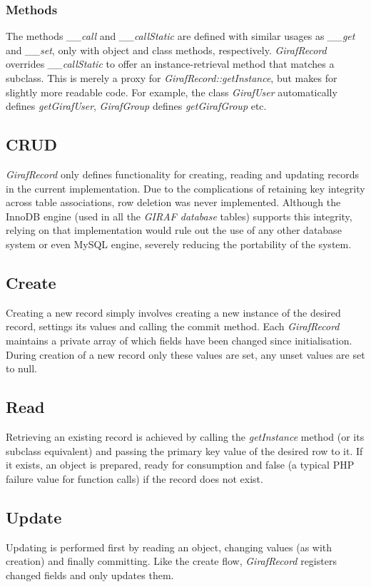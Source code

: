 \subsubsection*{Methods}
The methods \emph{\_\_call} and \emph{\_\_callStatic} are defined with similar usages as \emph{\_\_get} and \emph{\_\_set}, only with object and class methods, respectively. \emph{GirafRecord} overrides \emph{\_\_callStatic} to offer an instance-retrieval method that matches a subclass. This is merely a proxy for \emph{GirafRecord::getInstance}, but makes for slightly more readable code. For example, the class \emph{GirafUser} automatically defines \emph{getGirafUser}, \emph{GirafGroup} defines \emph{getGirafGroup} etc.

\subsection{CRUD}
\emph{GirafRecord} only defines functionality for creating, reading and updating records in the current implementation. Due to the complications of retaining key integrity across table associations, row deletion was never implemented. Although the InnoDB engine (used in all the \emph{GIRAF database} tables) supports this integrity, relying on that implementation would rule out the use of any other database system or even MySQL engine, severely reducing the portability of the system.

\subsection*{Create}
Creating a new record simply involves creating a new instance of the desired record, settings its values and calling the commit method. Each \emph{GirafRecord} maintains a private array of which fields have been changed since initialisation. During creation of a new record only these values are set, any unset values are set to null.

\subsection*{Read}
Retrieving an existing record is achieved by calling the \emph{getInstance} method (or its subclass equivalent) and passing the primary key value of the desired row to it. If it exists, an object is prepared, ready for consumption and false (a typical PHP failure value for function calls) if the record does not exist.

\subsection*{Update}
Updating is performed first by reading an object, changing values (as with creation) and finally committing. Like the create flow, \emph{GirafRecord} registers changed fields and only updates them.

